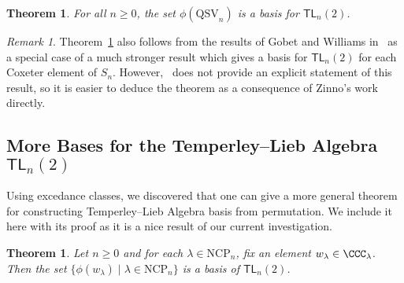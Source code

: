 \documentclass[12pt]{amsart}
\newtheorem{thm}[equation]{Theorem}
\theoremstyle{definition}
\theoremstyle{remark}
\newtheorem{rem}[equation]{Remark}
\numberwithin{equation}{section}
\newcommand{\TL}{\mathsf{TL}}
\newcommand{\QSV}{\mathrm{QSV}}
\newcommand{\NCP}{\mathrm{NCP}}
\begin{document}
\begin{thm}
\label{thm:TLbasis}
For all $n \ge 0$, the set $\phi(\QSV_{n})$ is a basis for $\TL_{n}(2)$.
\end{thm}

\begin{rem}
Theorem~\ref{thm:TLbasis} also follows from the results of Gobet and Williams in~\cite{GobetWilliams} as a special case of a much stronger result which gives a basis for $\TL_{n}(2)$ for each Coxeter element of $S_{n}$.  
However,~\cite{GobetWilliams} does not provide an explicit statement of this result, so it is easier to deduce the theorem as a consequence of Zinno's work directly.
\end{rem}

\subsection{More Bases for the Temperley--Lieb Algebra $\TL_{n}(2)$}

Using excedance classes, we discovered that one can give a more general theorem for constructing Temperley--Lieb Algebra basis from permutation.
We include it here with its proof as it is a nice result of our current investigation.

\begin{thm}
\label{thm:TLbases}
Let $n \ge 0$ and for each $\lambda \in \NCP_{n}$, fix an element $w_{\lambda} \in \CCC_{\lambda}$.  Then the set 
$\{\phi(w_{\lambda}) \;|\; \lambda \in \NCP_{n}\}$ is a basis of $\TL_{n}(2)$.
\end{thm}
\end{document}
